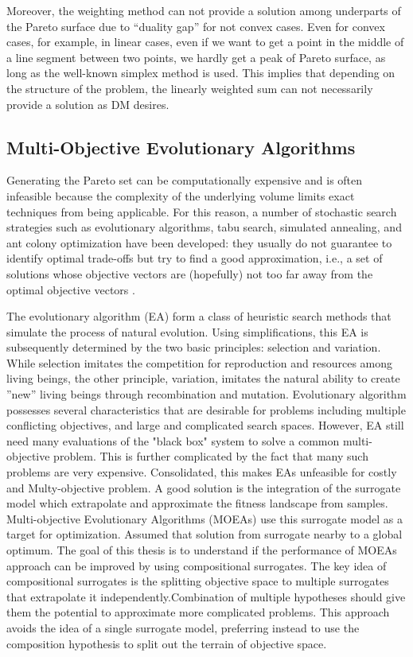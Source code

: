             Moreover, the weighting method can not provide a solution among underparts of the Pareto surface due to “duality gap” for not convex cases. Even for convex cases, for example, in linear cases, even if we want to get a point in the middle of a line segment between two points, we hardly get a peak of Pareto surface, as long as the well-known simplex method is used. This implies that depending on the structure of the problem, the linearly weighted sum can not necessarily provide a solution as DM desires. \cite{Nakayama05}

        \subsection{Multi-Objective Evolutionary Algorithms}

            Generating the Pareto set can be computationally expensive and is often infeasible because the complexity of the underlying volume limits exact techniques from being applicable. For this reason, a number of stochastic search strategies such as evolutionary algorithms, tabu search, simulated annealing, and ant colony optimization have been developed: they usually do not guarantee to identify optimal trade-offs but try to find a good approximation, i.e., a set of solutions whose objective vectors are (hopefully) not too far away from the optimal objective vectors \cite{EmmerichD18}.

            The evolutionary algorithm (EA) form a class of heuristic search methods that simulate the process of natural evolution.
            Using simplifications, this EA is subsequently determined by the two basic principles: selection and variation.
            While selection imitates the competition for reproduction and resources among living beings, the other principle, variation, imitates the natural ability to create ”new” living beings through recombination and mutation. Evolutionary algorithm possesses several characteristics that are desirable for problems including multiple conflicting objectives, and large and complicated search spaces. However, EA still need many evaluations of the "black box" system to solve a common multi-objective problem. This is further complicated by the fact that many such problems are very expensive. Consolidated, this makes EAs unfeasible for costly and Multy-objective problem.
            A good solution is the integration of the surrogate model which extrapolate and approximate the fitness landscape from samples. Multi-objective Evolutionary Algorithms (MOEAs) use this surrogate model as a target for optimization. Assumed that solution from surrogate nearby to a global optimum.
            The goal of this thesis is to understand if the performance of MOEAs approach can be improved by using compositional surrogates. The key idea of compositional surrogates is the splitting objective space to multiple surrogates that extrapolate it independently.Combination of multiple hypotheses should give them the potential to approximate more complicated problems. This approach avoids the idea of a single surrogate model, preferring instead to use the composition hypothesis to split out the terrain of objective space.

